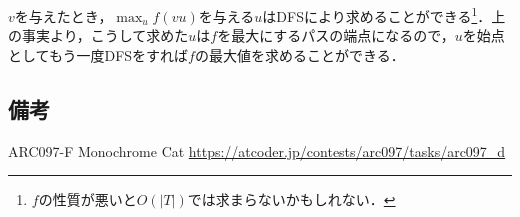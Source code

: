 \documentclass{scrartcl}
\theoremstyle{definition}
\begin{document}
$v$を与えたとき，$\max_u f(vu)$を与える$u$はDFSにより求めることができる\footnote{$f$の性質が悪いと$O(|T|)$では求まらないかもしれない．}．上の事実より，こうして求めた$u$は$f$を最大にするパスの端点になるので，$u$を始点としてもう一度DFSをすれば$f$の最大値を求めることができる．

\subsection*{備考}

ARC097-F Monochrome Cat \url{https://atcoder.jp/contests/arc097/tasks/arc097_d}
\end{document}
